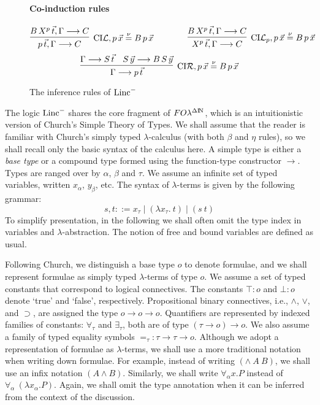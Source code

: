 \documentclass[preprint]{elsarticle}
\newcommand{\FOL   }{FO\lambda}
\newcommand{\FOLDN }{\FOL^{\Delta\N}}
\newcommand{\Linc}{{\rm Linc}^-}
\newcommand{\N}{{\rm I} \! {\rm N}}
\newcommand{\Seq}[2]{#1\longrightarrow #2}
\newcommand{\defnu}{\stackrel{\nu}{=}}
\newcommand{\coindR}{{\rm CI}{\cal R}}
\newcommand{\coindL}{{\rm CI}{\cal L}}
\newcommand{\coindLP}{{\rm CI}{\cal L}_p}
\newcommand{\oimp}{\supset}
\begin{document}
\begin{figure}
\paragraph{Co-induction rules}
$$
\infer[\coindL, p\,\vec x \defnu B\,p\,\vec x]
{\Seq{p\,\vec{t}, \Gamma}{C}} {\Seq{B\,X^p\,\vec{t}, \Gamma}{C} }
\qquad\qquad \infer[\coindLP, p\,\vec x \defnu B\,p\,\vec x]
{\Seq{X^p\,\vec{t}, \Gamma}{C}} {\Seq{B\,X^p\,\vec{t}, \Gamma}{C} }
$$
$$
\infer[\coindR, p\,\vec x \defnu B\,p\,\vec x]
{\Seq{\Gamma}{p\,\vec{t}}} {\Seq{\Gamma}{S\,\vec{t}} &
  \Seq{S\,\vec{y}}{B\,S\,\vec{y}} }
$$
\caption{The inference rules of $\Linc$}
\label{fig:linc}
\end{figure}


The logic $\Linc$ shares the core fragment of $\FOLDN$, which is an
intuitionistic version of Church's Simple Theory of Types.  We shall
assume that the reader is familiar with Church's simply typed $\lambda$-calculus
(with both $\beta$ and $\eta$ rules), so we shall recall only the basic
syntax of the calculus here. A simple type is either a \emph{base type}
or a compound type formed using the function-type constructor $\rightarrow$.
Types are ranged over by $\alpha$, $\beta$ and $\tau$.
We assume an infinite set of typed variables, written $x_\alpha$, $y_\beta$, etc.  
The syntax of $\lambda$-terms is given by the following grammar:
$$
s, t ::= x_\tau \mid (\lambda x_\tau.\ t) \mid (s~t)
$$
To simplify presentation, in the following we shall often omit the type 
index in variables and $\lambda$-abstraction. The notion of free and bound
variables are defined as usual.

Following Church, we distinguish a base type $o$ to denote formulae,
and we shall represent formulae as simply typed $\lambda$-terms of
type $o$.  We assume a set of typed constants that correspond to
logical connectives.  The constants $\top : o$ and $\bot : o$ denote
`true' and `false', respectively.  Propositional binary connectives,
i.e., $\land$, $\lor$, and $\oimp$, are assigned the type $o
\rightarrow o \rightarrow o$.  Quantifiers are represented by indexed
families of constants: $\forall_\tau$ and $\exists_\tau$, both are of
type $(\tau \rightarrow o) \rightarrow o$.  We also assume a family of
typed equality symbols $=_\tau : \tau \rightarrow \tau \rightarrow o$.
Although we adopt a representation of formulae as $\lambda$-terms, we
shall use a more traditional notation when writing down formulae. For
example, instead of writing $(\land~A~B)$, we shall use an infix
notation $(A \land B)$.  Similarly, we shall write $\forall_\alpha
x. P$ instead of $\forall_\alpha~(\lambda x_\alpha.P)$. Again, we
shall omit the type annotation when it can be inferred from the
context of the discussion.
\end{document}
